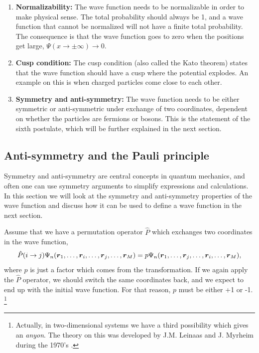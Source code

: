 \begin{enumerate}
	\item \textbf{Normalizability:} The wave function needs to be normalizable in order to make physical sense. The total probability should always be 1, and a wave function that cannot be normalized will not have a finite total probability. The consequence is that the wave function goes to zero when the positions get large, $\Psi(x\rightarrow\pm\infty)\rightarrow 0$. 
	
	\item \textbf{Cusp condition:} The cusp condition (also called the Kato theorem) states that the wave function should have a cusp where the potential explodes. An example on this is when charged particles come close to each other. %
	
	\item \textbf{Symmetry and anti-symmetry:} The wave function needs to be either symmetric or anti-symmetric under exchange of two coordinates, dependent on whether the particles are fermions or bosons. This is the statement of the sixth postulate, which will be further explained in the next section.
\end{enumerate}

\subsection{Anti-symmetry and the Pauli principle} \label{sec:symmetry}
Symmetry and anti-symmetry are central concepts in quantum mechanics, and often one can use symmetry arguments to simplify expressions and calculations. In this section we will look at the symmetry and anti-symmetry properties of the wave function and discuss how it can be used to define a wave function in the next section.

Assume that we have a permutation operator $\hat{P}$ which exchanges two coordinates in the wave function,
\begin{equation}
\hat{P}(i\rightarrow j)\Psi_n(\boldsymbol{{r}}_1,\hdots,\boldsymbol{{r}}_i,\hdots,\boldsymbol{{r}}_j,\hdots,\boldsymbol{{r}}_M)=p\Psi_n(\boldsymbol{{r}}_1,\hdots,\boldsymbol{{r}}_j,\hdots,\boldsymbol{{r}}_i,\hdots,\boldsymbol{{r}}_M),
\end{equation}
where $p$ is just a factor which comes from the transformation. If we again apply the $\hat{P}$ operator, we should switch the same coordinates back, and we expect to end up with the initial wave function. For that reason, $p$ must be either +1 or -1. \footnote{Actually, in two-dimensional systems we have a third possibility which gives an \textit{anyon}. The theory on this was developed by J.M. Leinaas and J. Myrheim during the 1970's \cite{leinaas_one_1977}.}


